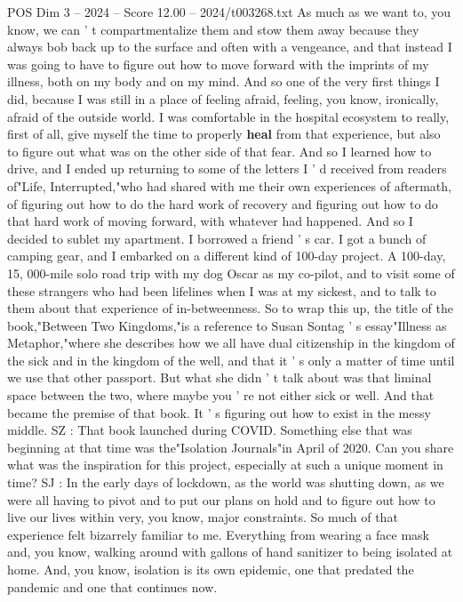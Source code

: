 \begin{textsample}{POS Dim 3 – 2024 – Score 12.00 – 2024/t003268.txt}
As much as we want to, you know, we can ' t compartmentalize them and stow them away because they always bob back up to the surface and often with a vengeance, and that instead I was going to have to figure out how to move forward with the imprints of my illness, both on my body and on my mind.
And so one of the very first things I did, because I was still in a place of feeling afraid, feeling, you know, ironically, afraid of the outside world.
I was comfortable in the hospital ecosystem to really, first of all, give myself the time to properly \textbf{heal} from that experience, but also to figure out what was on the other side of that fear.
And so I learned how to drive, and I ended up returning to some of the letters I ' d received from readers of"Life, Interrupted,"who had shared with me their own experiences of aftermath, of figuring out how to do the hard work of recovery and figuring out how to do that hard work of moving forward, with whatever had happened.
And so I decided to sublet my apartment.
I borrowed a friend ' s car.
I got a bunch of camping gear, and I embarked on a different kind of 100-day project.
A 100-day, 15, 000-mile solo road trip with my dog Oscar as my co-pilot, and to visit some of these strangers who had been lifelines when I was at my sickest, and to talk to them about that experience of in-betweenness.
So to wrap this up, the title of the book,"Between Two Kingdoms,"is a reference to Susan Sontag ' s essay"Illness as Metaphor,"where she describes how we all have dual citizenship in the kingdom of the sick and in the kingdom of the well, and that it ' s only a matter of time until we use that other passport.
But what she didn ' t talk about was that liminal space between the two, where maybe you ' re not either sick or well.
And that became the premise of that book.
It ' s figuring out how to exist in the messy middle.
SZ : That book launched during COVID.
Something else that was beginning at that time was the"Isolation Journals"in April of 2020.
Can you share what was the inspiration for this project, especially at such a unique moment in time?
SJ : In the early days of lockdown, as the world was shutting down, as we were all having to pivot and to put our plans on hold and to figure out how to live our lives within very, you know, major constraints.
So much of that experience felt bizarrely familiar to me.
Everything from wearing a face mask and, you know, walking around with gallons of hand sanitizer to being isolated at home.
And, you know, isolation is its own epidemic, one that predated the pandemic and one that continues now.

\end{textsample}
